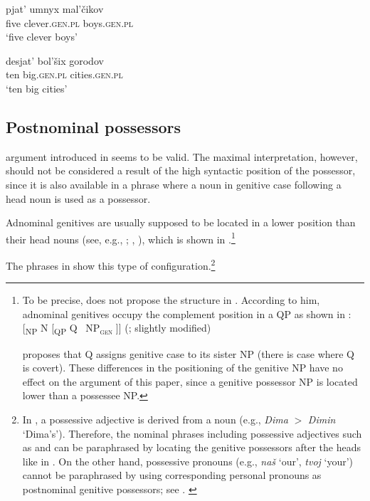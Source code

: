 \documentclass[output=paper]{langscibook}
\begin{document}
\ea
\ea\label{Ladj1}
\gll  pjat' umnyx mal'čikov\\
five clever.\textsc{gen.pl} boys.\textsc{gen.pl}\\
\glt `five clever boys'

\ex\label{Ladj2}
\gll desjat' bol'šix gorodov\\
ten big.\textsc{gen.pl} cities.\textsc{gen.pl}\\
\glt `ten big cities' \hfill \citep[169]{Kagan.Pereltsvaig2012}
\z\z

\subsection{Postnominal possessors}\label{ID}

 argument introduced in  seems to be valid. The maximal interpretation, however, should not be considered a result of the high syntactic position of the possessor, since it is also available in a phrase where a noun in genitive case following a head noun is used as a possessor.

Adnominal genitives are usually supposed to be located in a lower position than their head nouns (see, e.g., \citealt[38]{Franks1995}; \citealt[214]{Bailyn2012}, \citealt[84]{Mitrenina2012}), which is shown in .\footnote{To be precise, \citet{Bailyn2012} does not propose the structure in . According to him, adnominal genitives occupy the complement position in a QP as shown in :
    \ea\label{bailyn-i}
    [\textsubscript{NP} N [\textsubscript{QP} Q \, NP\textsubscript{\textsc{gen}} ]]
	\hfill (\citealt[214]{Bailyn2012}; slightly modified)
    \z

    \noindent \citet[214]{Bailyn2012} proposes that Q assigns genitive case to its sister NP (there is case where Q is covert). These differences in the positioning of the genitive NP have no effect on the argument of this paper, since a genitive possessor NP is located lower than a possessee NP.}

The phrases in  show this type of configuration.\footnote{In , a possessive adjective is derived from a noun (e.g., \textit{Dima} $>$ \textit{Dimin} `Dima's'). Therefore, the nominal phrases including possessive adjectives such as  and  can be paraphrased by locating the genitive possessors after the heads like in  \citep[see][]{Svedova1980}. On the other hand, possessive pronouns (e.g., \textit{naš} `our', \textit{tvoj} `your') cannot be paraphrased by using corresponding personal pronouns as postnominal genitive possessors; see .
    \ea\label{vi-below}
	\z\z}
	
\end{document}
